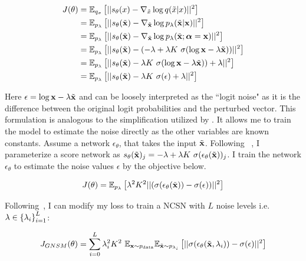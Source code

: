 \begin{align*}
\label{eq:cdsm}
    J(\theta) &= \mathbb{E}_{q_{\sigma}} \left[ { || s_\theta(x) - \nabla_{\Tilde{x}} \log q(\tilde{x} | x) ||^2 } \right]\\
     &= \mathbb{E}_{p_{\lambda}} \left[ { || s_\theta(\Tilde{\mathbf{x}}) - \nabla_{\Tilde{\mathbf{x}}} \log p_\lambda(\tilde{\mathbf{x}} | \mathbf{x}) ||^2 } \right] \\
     &= \mathbb{E}_{p_{\lambda}} \left[ { || s_\theta(\Tilde{\mathbf{x}}) - \nabla_{\Tilde{\mathbf{x}}} \log p_\lambda(\tilde{\mathbf{x}} ; \boldsymbol{\alpha} = \mathbf{x}) ||^2 } \right] \\
     &= \mathbb{E}_{p_{\lambda}} \left[ { || s_\theta(\Tilde{\mathbf{x}}) - (- \lambda + \lambda K~\sigma(\log \mathbf{x} - \lambda \Tilde{\mathbf{x}})) ||^2 } \right] \\
     &= \mathbb{E}_{p_{\lambda}} \left[ { || s_\theta(\Tilde{\mathbf{x}}) - \lambda K~\sigma(\log \mathbf{x} - \lambda \Tilde{\mathbf{x}}))  + \lambda ||^2 } \right] \\
     &= \mathbb{E}_{p_{\lambda}} \left[ { || s_\theta(\Tilde{\mathbf{x}}) - \lambda K~\sigma(\epsilon)  + \lambda ||^2 } \right]
\end{align*}

Here $\epsilon=\log \mathbf{x} - \lambda \Tilde{\mathbf{x}}$ and can be loosely interpreted as the ``logit noise" as it is the difference between the original logit probabilities and the perturbed vector. This formulation is analogous to the simplification utilized by \cite{song2020score,ho2020denoising}. It allows me to train the model to estimate the noise directly as the other variables are known constants. Assume a network $\epsilon_\theta$, that takes the input $\Tilde{\mathbf{x}}$. Following ~, I parameterize a score network as $s_\theta(\Tilde{\mathbf{x}})_j = - \lambda + \lambda K~\sigma(\epsilon_\theta(\Tilde{\mathbf{x}}))_j$. I train the network $\epsilon_\theta$ to estimate the noise values $\epsilon$ by the objective below.  

\begin{equation}
\label{eq:train_obj}
    J(\theta)  = \mathbb{E}_{p_{\lambda}} \left[ { \lambda^2 K^2 ||( \sigma( \epsilon_\theta(\Tilde{\mathbf{x}}) ) - \sigma(\epsilon) )||^2 } \right]
\end{equation}

Following~\cite{Song2019}, I can modify my loss to train a NCSN with $L$ noise levels i.e. $\lambda \in \left\{ {\lambda_i} \right\}_{i=1}^L$:

\begin{equation*}
    J_{GNSM}(\theta)  = \sum_{i=0}^{L} \lambda_i^2 K^2 ~\mathbb{E}_{\mathbf{x} \sim p_{\text{data}}} \mathbb{E}_{\Tilde{\mathbf{x}} \sim p_{\lambda_i}} \left[ { || \sigma( \epsilon_\theta(\Tilde{\mathbf{x}}, \lambda_i) ) - \sigma(\epsilon) ||^2 } \right]
\end{equation*}

